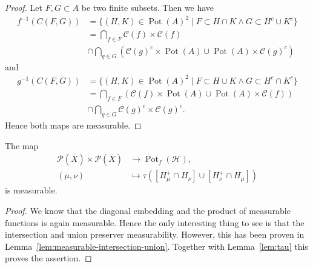\begin{proof}
  \label{lem:measurable-intersection-union}
  Let \(F, G \subset A\) be two finite subsets. Then we have
  \begin{align*}
    f^{-1}(C(F,G))
    & = \{(H,K) \in \operatorname{Pot}(A)^2 \mid F \subset H \cap K \wedge G \subset H^c \cup K^c\} \\
    & = \bigcap_{f \in F} \mathcal{C}(f) \times \mathcal{C}(f)\\
    & \cap \bigcap_{g \in G} (\mathcal{C}(g)^c \times \operatorname{Pot}(A) \cup \operatorname{Pot}(A) \times \mathcal{C}(g)^c)
  \end{align*}
  and
  \begin{align*}
    g^{-1}(C(F,G))
    & = \{(H,K) \in \operatorname{Pot}(A)^2 \mid F \subset H \cup K \wedge G \subset H^c \cap K^c\} \\
    & = \bigcap_{f \in F} (\mathcal{C}(f) \times \operatorname{Pot}(A) \cup \operatorname{Pot}(A) \times\mathcal{C}(f))\\
    & \cap \bigcap_{g \in G} \mathcal{C}(g)^c \times \mathcal{C}(g)^c.
  \end{align*}
  Hence both maps are measurable.
\end{proof}

\begin{lemma}
  \label{lem:measurable-tau-int}
  The map
  \begin{align*}
    \mathcal{P}(\bar X) \times \mathcal{P}(\bar X) &\to \operatorname{Pot}_f(\mathcal{H}),\\
    (\mu,\nu) &\mapsto \tau([H_\mu^+ \cap H_\nu] \cup [H_\nu^+ \cap H_\mu])
  \end{align*}
  is measurable.
\end{lemma}

\begin{proof}
  We know that the diagonal embedding and the product of measurable functions is again measurable. Hence the only interesting thing to see is that the intersection and union preserver measurability. However, this has been proven in Lemma~\ref{lem:measurable-intersection-union}. Together with Lemma~\ref{lem:tau} this proves the assertion.
\end{proof}

